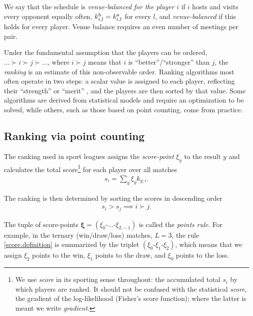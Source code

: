 \documentclass[letterpaper,12pt]{article}
\newcommand{\tnr}[1]{{\textnormal{#1}}}
\newcommand{\bxi}{\boldsymbol{\xi}}
\newcommand{\ld}{\ldots}
\begin{document}
We say that the schedule is \emph{venue-balanced for the player $i$} if $i$ hosts and visits every opponent equally often, $k^\tnr{h}_{i,l}=k^\tnr{a}_{i,l}$ for every $l$, and \emph{venue-balanced} if this holds for every player. Venue balance requires an even number of meetings per pair. %

Under the fundamental assumption that the players can be ordered, $\ld \succ i \succ j \succ \ld$, where $i\succ j$ means that $i$ is ``better''/``stronger'' than $j$, the \emph{ranking} is an estimate of this non-observable order. Ranking algorithms most often operate in two steps: a scalar value is assigned to each player, reflecting their ``strength'' or ``merit'' \citep{Langeville12_book,Newman23}, and the players are then sorted by that value. Some algorithms are derived from statistical models and require an optimization to be solved, while others, such as those based on point counting, come from practice.

\subsection{Ranking via point counting}\label{Sec:score.point.accumulation}

The ranking used in sport leagues assigns the \emph{score-point} $\xi_y$ to the result $y$ and calculates the total score\footnote{We use \emph{score} in its sporting sense throughout: the accumulated total $s_i$ by which players are ranked. It should not be confused with the statistical \emph{score}, the gradient of the log-likelihood (Fisher's score function); where the latter is meant we write \emph{gradient}.} for each player over all matches
\begin{align}
\label{score.definition}
    s_i=\sum_y \xi_{y} k_{y;i}.
\end{align}

The ranking is then determined by sorting the scores in descending order
\begin{align}
\label{score.implication}
    s_i> s_j \implies  i \succ j.
\end{align}

The tuple of score-points $\bxi=(\xi_0\text{-}\ld\text{-}\xi_{L-1})$ is called the \emph{points rule}. For example, in the ternary (win/draw/loss) matches, $L=3$, the rule \eqref{score.definition} is summarized by the triplet $(\xi_0\text{-}\xi_1\text{-}\xi_2)$, which means that we assign $\xi_2$ points to the win, $\xi_1$ points to the draw, and $\xi_0$ points to the loss.
\end{document}
